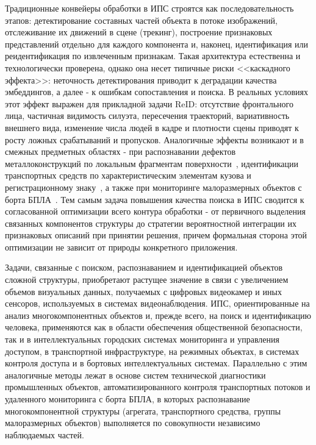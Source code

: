 Традиционные конвейеры обработки в ИПС строятся как последовательность
этапов: детектирование составных частей объекта в потоке изображений,
отслеживание их движений в сцене (трекинг), построение признаковых
представлений отдельно для каждого компонента и, наконец, идентификация
или реидентификация по извлеченным признакам. Такая архитектура естественна
и технологически проверена, однако она несет типичные риски
<<каскадного эффекта>>: неточность детектирования приводит к деградации
качества эмбеддингов, а далее - к ошибкам сопоставления и поиска. В реальных
условиях этот эффект выражен для прикладной задачи ReID:
отсутствие фронтального лица, частичная видимость силуэта, пересечения
траекторий, вариативность внешнего вида, изменение числа людей в кадре и
плотности сцены приводят к росту ложных срабатываний и пропусков.
Аналогичные эффекты возникают и в смежных предметных областях - при
распознавании дефектов металлоконструкций по локальным фрагментам
поверхности~\cite{Rusakov2021corrosion}, идентификации транспортных
средств по характеристическим элементам кузова и регистрационному
знаку~\cite{Rusakov2020license}, а также при мониторинге малоразмерных
объектов с борта БПЛА~\cite{Rusakov2023uavspeed,Rusakov2024marine}. Тем
самым задача повышения качества поиска в ИПС сводится к согласованной
оптимизации всего контура обработки - от первичного выделения связанных
компонентов структуры до стратегии вероятностной интеграции их признаковых
описаний при принятии решения, причем формальная сторона этой оптимизации
не зависит от природы конкретного приложения.

Задачи, связанные с поиском,
распознаванием и идентификацией объектов сложной структуры, приобретают
растущее значение в связи с увеличением объемов визуальных данных,
получаемых с цифровых видеокамер и иных сенсоров, используемых в системах
видеонаблюдения. ИПС, ориентированные на анализ многокомпонентных
объектов и, прежде всего, на поиск и идентификацию человека, применяются как в области обеспечения общественной безопасности, так и в
интеллектуальных городских системах мониторинга и управления доступом,
в транспортной инфраструктуре, на режимных объектах, в системах контроля
доступа и в бортовых интеллектуальных системах. Параллельно с этим
аналогичные методы лежат в основе систем технической диагностики
промышленных объектов, автоматизированного контроля транспортных потоков
и удаленного мониторинга с борта БПЛА, в которых распознавание
многокомпонентной структуры (агрегата, транспортного средства, группы
малоразмерных объектов) выполняется по совокупности независимо
наблюдаемых частей.


